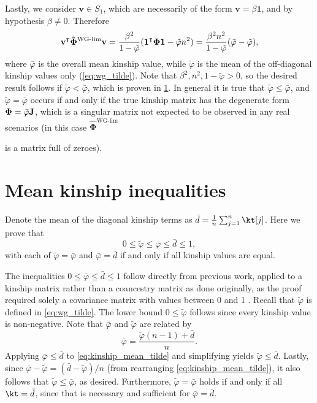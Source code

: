 \documentclass[11pt]{article}
\newcommand{\kinMat}{%
  \ensuremath{%
    \mathbf{\Phi}
  }%
  \xspace%
}%
\newcommand{\kinMatEstNamed}[1]{%
  \ensuremath{%
    \mathbf{\hat{\Phi}}^\text{#1}
  }%
  \xspace%
}%
\newcommand{\kinMatWGLim}{%
  \kinMatEstNamed{WG-lim}
}%
\begin{document}
\begin{appendices}
  Lastly, we consider $\mathbf{v} \in S_1$, which are necessarily of the form $\mathbf{v} = \beta \mathbf{1}$, and by hypothesis $\beta \ne 0$.
  Therefore
  $$
  \mathbf{v}^\intercal \kinMatWGLim \mathbf{v}
  =
  \frac{ \beta^2 }{1-\tilde{\varphi}}(\boldsymbol{1^\intercal \kinMat 1} - \tilde{\varphi} n^2)
  =
  \frac{ \beta^2 n^2 }{1-\tilde{\varphi}}(\bar{\varphi}-\tilde{\varphi})
  ,
  $$
  where $\bar{\varphi}$ is the overall mean kinship value, while $\tilde{\varphi}$ is the mean of the off-diagonal kinship values only (\cref{eq:wg_tilde}).
  Note that $\beta^2, n^2, 1 - \tilde{\varphi} > 0$, so the desired result follows if $\tilde{\varphi} < \bar{\varphi}$, which is proven in \cref{sec:mean_kinship_ineqs}.
  In general it is true that $\tilde{\varphi} \le \bar{\varphi}$, and $\tilde{\varphi} = \bar{\varphi}$ occurs if and only if the true kinship matrix has the degenerate form $\kinMat = \bar{\varphi} \mathbf{J}$, which is a singular matrix not expected to be observed in any real scenarios (in this case \kinMatWGLim is a matrix full of zeroes).

  \section{Mean kinship inequalities}

  \label{sec:mean_kinship_ineqs}

  Denote the mean of the diagonal kinship terms as $\bar{d} = \frac{1}{n} \sum_{j=1}^n \kt[j]$.
  Here we prove that
  $$
  0 \le \tilde{\varphi} \le \bar{\varphi} \le \bar{d} \le 1,
  $$
  with each of $\tilde{\varphi} = \bar{\varphi}$ and $\bar{\varphi}= \bar{d}$ if and only if all kinship values are equal.

  The inequalities $0 \le \bar{\varphi} \le \bar{d} \le 1$ follow directly from previous work, applied to a kinship matrix rather than a coancestry matrix as done originally, as the proof required solely a covariance matrix with values between 0 and 1 \citep{ochoa_estimating_2021}.
  Recall that $\tilde{\varphi}$ is defined in \cref{eq:wg_tilde}.
  The lower bound $0 \le \tilde{\varphi}$ follows since every kinship value is non-negative.
  Note that $\bar{\varphi}$ and $\tilde{\varphi}$ are related by
  \begin{equation}
    \label{eq:kinship_mean_tilde}
    \bar{\varphi}
    =
    \frac{ \tilde{\varphi}(n-1) + \bar{d} }{n}.
  \end{equation}
  Applying $\bar{\varphi} \le \bar{d}$ to \cref{eq:kinship_mean_tilde} and simplifying yields $\tilde{\varphi} \le \bar{d}$.
  Lastly, since $\bar{\varphi} - \tilde{\varphi} = ( \bar{d}-\tilde{\varphi} ) / n$ (from rearranging \cref{eq:kinship_mean_tilde}), it also follows that $\tilde{\varphi} \le \bar{\varphi}$, as desired.
  Furthermore, $\tilde{\varphi} = \bar{\varphi}$ holds if and only if all $\kt = \bar{d}$, since that is necessary and sufficient for $\bar{\varphi} = \bar{d}$.

\end{appendices}
\end{document}
